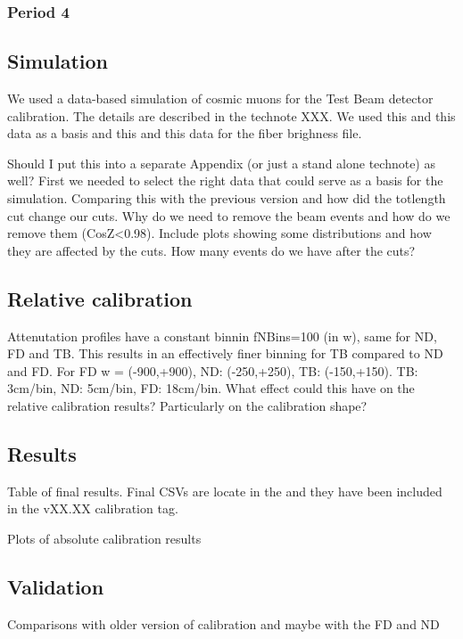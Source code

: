 \documentclass[12pt,a4paper]{article}
\begin{document}
\subsubsection{Period 4}


\subsection{Simulation}
We used a data-based simulation of cosmic muons for the Test Beam detector calibration. The details are described in the technote XXX. We used this and this data as a basis and this and this data for the fiber brighness file.

Should I put this into a separate Appendix (or just a stand alone technote) as well?
First we needed to select the right data that could serve as a basis for the simulation. Comparing this with the previous version and how did the totlength cut change our cuts. Why do we need to remove the beam events and how do we remove them (CosZ<0.98). Include plots showing some distributions and how they are affected by the cuts. How many events do we have after the cuts?

\subsection{Relative calibration}

Attenutation profiles have a constant binnin fNBins=100 (in w), same for ND, FD and TB. This results in an effectively finer binning for TB compared to ND and FD. For FD w = (-900,+900), ND: (-250,+250), TB: (-150,+150).
TB: 3cm/bin, ND: 5cm/bin, FD: 18cm/bin.
What effect could this have on the relative calibration results? Particularly on the calibration shape?

\subsection{Results}
Table of final results.
Final CSVs are locate in the  and they have been included in the vXX.XX calibration tag.

Plots of absolute calibration results

\subsection{Validation}
Comparisons with older version of calibration and maybe with the FD and ND
\end{document}
